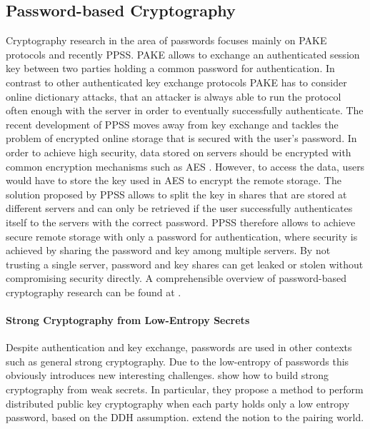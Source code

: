 \subsection{Password-based Cryptography}
Cryptography research in the area of passwords focuses mainly on \ac{PAKE} protocols and recently \ac{PPSS}.
\ac{PAKE} allows to exchange an authenticated session key between two parties holding a common password for authentication.
In contrast to other authenticated key exchange protocols \ac{PAKE} has to consider online dictionary attacks, \ie that an attacker is always able to run the protocol often enough with the server in order to eventually successfully authenticate.
The recent development of \ac{PPSS} moves away from key exchange and tackles the problem of encrypted online storage that is secured with the user's password.
In order to achieve high security, data stored on servers should be encrypted with common encryption mechanisms such as \ac{AES} \cite{FIPS-197}.
However, to access the data, users would have to store the key used in \ac{AES} to encrypt the remote storage.
The solution proposed by \ac{PPSS} allows to split the key in shares that are stored at different servers and can only be retrieved if the user successfully authenticates itself to the servers with the correct password.
\ac{PPSS} therefore allows to achieve secure remote storage with only a password for authentication, where security is achieved by sharing the password and key among multiple servers.
By not trusting a single server, password and key shares can get leaked or stolen without compromising security directly.
A comprehensible overview of password-based cryptography research can be found at \citet{KieferXX}.

\paragraph{Strong Cryptography from Low-Entropy Secrets}
Despite authentication and key exchange, passwords are used in other contexts such as general strong cryptography.
Due to the low-entropy of passwords this obviously introduces new interesting challenges.
\citet{AbdallaBCP09} show how to build strong cryptography from weak secrets.
In particular, they propose a method to perform distributed public key cryptography when each party holds only a low entropy password, based on the \ac{DDH} assumption.
\citet{BoyenCFP10} extend the notion to the pairing world.


